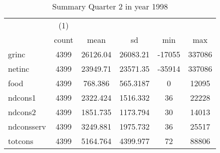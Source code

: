 \begin{table}[htbp]\centering
\def\sym#1{\ifmmode^{#1}\else\(^{#1}\)\fi}
\caption{Summary Quarter 2 in year 1998 \label{sum\_Q2\_y1998}}
\begin{tabular}{l*{1}{ccccc}}
\hline\hline
            &\multicolumn{1}{c}{(1)}&            &            &            &            \\
            &       count&        mean&          sd&         min&         max\\
\hline
grinc       &        4399&    26126.04&    26083.21&      -17055&      337086\\
netinc      &        4399&    23949.71&    23571.35&      -35914&      337086\\
food        &        4399&     768.386&    565.3187&           0&       12095\\
ndcons1     &        4399&    2322.424&    1516.332&          36&       22228\\
ndcons2     &        4399&    1851.735&    1173.794&          30&       14013\\
ndconsserv  &        4399&    3249.881&    1975.732&          36&       25517\\
totcons     &        4399&    5164.764&    4399.977&          72&       88806\\
\hline\hline
\end{tabular}
\end{table}
